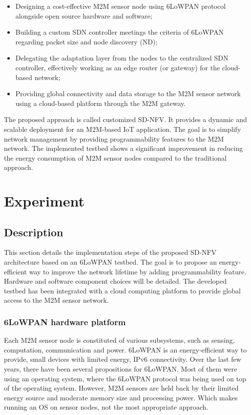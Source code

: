 \documentclass[10pt,journal,compsoc]{IEEEtran}
\begin{document}
\begin{itemize}
    \item Designing a cost-effective M2M sensor node using 6LoWPAN 
    protocol alongside open source hardware and software;
    \item Building a custom SDN controller meetings the criteria of
    6LoWPAN regarding packet size and node discovery (ND);
    \item Delegating the adaptation layer from the nodes to the centralized 
    SDN controller, effectively working as an edge router (or gateway) for 
    the cloud-based network;
    \item Providing global connectivity and data storage to the M2M sensor 
    network using a cloud-based platform through the M2M gateway.
\end{itemize}
The proposed approach is called customized SD-NFV. It provides a dynamic 
and scalable deployment for an M2M-based IoT application. The goal is 
to simplify network management by providing programmability features 
to the M2M network. The implemented testbed shows a significant 
improvement in reducing the energy consumption of M2M sensor nodes 
compared to the traditional approach.

\section{Experiment}\label{sec:experiment}
\subsection{Description}

This section details the implementation steps of the proposed SD-NFV 
architecture based on an 6LoWPAN testbed. The goal is to propose 
an energy-efficient way to improve the network lifetime by adding 
programmability feature. Hardware and software component choices 
will be detailed. The developed testbed has been integrated with a cloud 
computing platform to provide global access to the M2M sensor network.

\subsubsection{6LoWPAN hardware platform}

Each M2M sensor node is constituted of various subsystems, such as 
sensing, computation, communication and power. 6LoWPAN is an 
energy-efficient way to provide, small devices with limited energy, 
IPv6 connectivity. Over the last few years, there have been several 
propositions for 6LoWPAN. Most of them were using an operating system, 
where the 6LoWPAN protocol was being used on top of the operating system. 
However, M2M sensors are held back by their limited energy source and 
moderate memory size and processing power. Which makes running an OS 
on sensor nodes, not the most appropriate approach.
\end{document}
